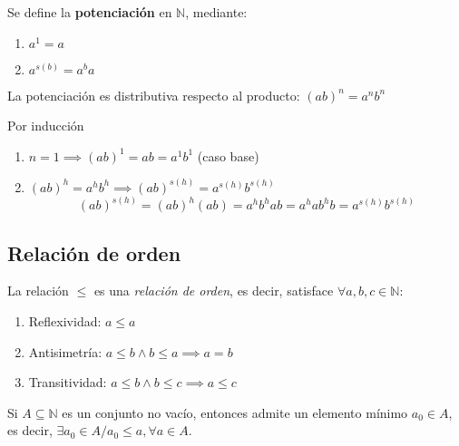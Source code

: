 Se define la \textbf{potenciación} en $\mathbb{N}$, mediante: 

\begin{fmd-definition}[Potenciación en $\N$]
	\begin{enumerate}[label=\alph*)]
		\item $a^1 = a$
		\item $a^{s(b)} = a^ba$
	\end{enumerate}
\end{fmd-definition}


\begin{fmd-proposition}
	La potenciación es distributiva respecto al producto: $(ab)^n = a^n b^n$
\end{fmd-proposition}

\begin{fmd-proof}
	 Por inducción
	\begin{enumerate}[label=\roman*)]
		\item $n=1 \implies (ab)^1 = ab = a^1 b^1$ (caso base)
		\item $(ab)^h = a^h b^h \implies (ab)^{s(h)} = a^{s(h)}b^{s(h)}$
		\[ (ab)^{s(h)} = (ab)^h (ab) = a^hb^hab = a^ha b^hb = a^{s(h)}b^{s(h)} \]
	\end{enumerate}
\end{fmd-proof}


\subsection{Relación de orden}
\vspace{3mm}
\begin{fmd-definition}
	La relación $\le$ es una \textit{relación de orden}, es decir, satisface $\forall a, b, c \in \mathbb{N}$:
	\begin{enumerate}
		\item Reflexividad: $a \le a $
		\item Antisimetría: $a \le b \land b \le a \implies a=b$
		\item Transitividad: $a \le b \land b \le c \implies a \le c$
	\end{enumerate}
\end{fmd-definition}

\begin{fmd-theorem} 
	Si $A \subseteq \mathbb{N}$ es un conjunto no vacío, entonces admite un elemento mínimo $a_0 \in A$, es decir, $\exists a_0 \in A / a_0 \le a, \forall a \in A$.
\end{fmd-theorem}

